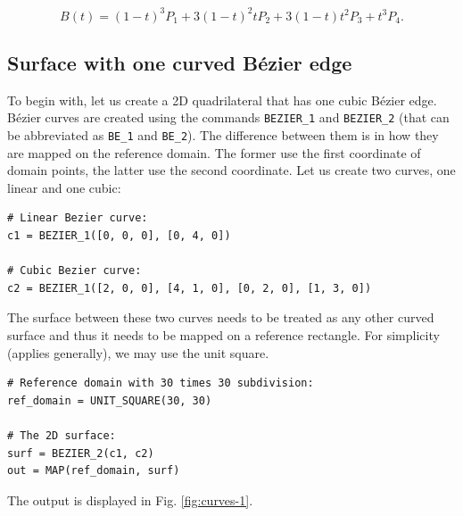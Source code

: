 $$
  B(t) = (1 - t)^3 P_1 + 3(1 - t)^2t P_2 + 3(1-t)t^2 P_3 + t^3 P_4.
$$ 

\subsection{Surface with one curved B\'ezier edge}

To begin with, let us create a 2D quadrilateral that has one cubic B\'ezier edge. 
B\'ezier curves are created using the commands {\tt BEZIER\_1} and {\tt BEZIER\_2} 
(that can be abbreviated as {\tt BE\_1} and {\tt BE\_2}). The difference between
them is in how they are mapped on the reference domain. The former use the 
first coordinate of domain points, the latter use the second coordinate. Let
us create two curves, one linear and one cubic:\\

\begin{bbox}
\begin{verbatim}
# Linear Bezier curve:
c1 = BEZIER_1([0, 0, 0], [0, 4, 0])

# Cubic Bezier curve:
c2 = BEZIER_1([2, 0, 0], [4, 1, 0], [0, 2, 0], [1, 3, 0])
\end{verbatim}
\end{bbox}
\vspace{6mm}

\noindent
The surface between these two curves needs to be treated as any other curved 
surface and thus it needs to be mapped on a reference rectangle. For simplicity 
(applies generally), we may use the unit square. 

\begin{bbox}
\begin{verbatim}
# Reference domain with 30 times 30 subdivision:
ref_domain = UNIT_SQUARE(30, 30)

# The 2D surface:
surf = BEZIER_2(c1, c2)
out = MAP(ref_domain, surf)
\end{verbatim}
\end{bbox}
\vspace{6mm}

\noindent
The output is displayed in Fig. \ref{fig:curves-1}.\\

